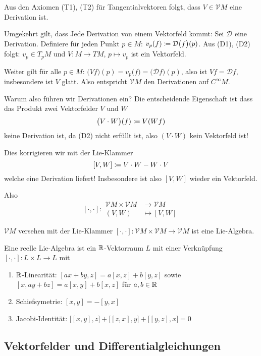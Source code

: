 \documentclass[a4paper,twoside,DIV15,BCOR12mm]{scrbook}
\newcommand{\V}{\mathcal V}
\begin{document}
Aus den Axiomen (T1), (T2) für Tangentialvektoren folgt, dass $V\in\V M $ eine Derivation ist.

Umgekehrt gilt, dass Jede Derivation von einem Vektorfeld kommt:  Sei $\mathcal D$ eine Derivation. Definiere für jeden Punkt $p\in M$: $v_p(f) \da \mathcal D\big(f\big)(p)$. Aus (D1), (D2) folgt: $v_p\in T_pM$ und $V: M \to TM$, $p\mapsto v_p$ ist ein Vektorfeld.

Weiter gilt für alle $p\in M$: $\big(Vf\big)(p) = v_p\big(f\big) = \big(\mathcal D f\big) (p)$, also ist $Vf = \mathcal D f$, insbesondere ist $V$ glatt. Also entspricht $\V M $ den Derivationen auf $C^\infty M$.

Warum also führen wir Derivationen ein? Die entscheidende Eigenschaft ist dass das Produkt zwei Vektorfelder $V$ und $W$
\[
\big(V \cdot W\big) (f) \da V (W f)
\]
keine Derivation ist, da (D2) nicht erfüllt ist, also $(V\cdot W)$ kein Vektorfeld ist!

Dies korrigieren wir mit der Lie-Klammer
\[
[V,W] \da V\cdot W  - W\cdot V
\]
welche eine Derivation liefert! Insbesondere ist also $[V,W]$ wieder ein Vektorfeld.

Also 
\[[\cdot,\cdot]:
\begin{aligned}
\V M  \times \V M  &\to \V M  \\
(V,W) &\mapsto [V,W]
\end{aligned}
\]

\begin{lemma}
$\V M $ versehen mit der Lie-Klammer $[\cdot,\cdot]:\V M  \times \V M  \to \V M $ ist eine Lie-Algebra.
\label{lem5}
\end{lemma}

\begin{definition}
Eine reelle Lie-Algebra ist ein $\mathbb{R}$-Vektorraum $L$ mit einer Verknüpfung $[\cdot,\cdot]: L\times L \to L$ mit 
\begin{enumerate}[(L1)]
\item $\mathbb{R}$-Linearität: $[ax+by, z] = a [x,z] + b[y,z]$ sowie
$[x,ay + bz] = a[x,y] + b[x,z]$ für $a,b\in\mathbb{R}$
\item Schiefsymetrie: $[x,y] = -[y,x]$
\item Jacobi-Identität: $\big[ [x,y], z\big] + \big[ [z,x], y\big] + \big[[y,z], x\big] = 0$
\end{enumerate}
\end{definition}

\subsection*{Vektorfelder und Differentialgleichungen}
\end{document}
